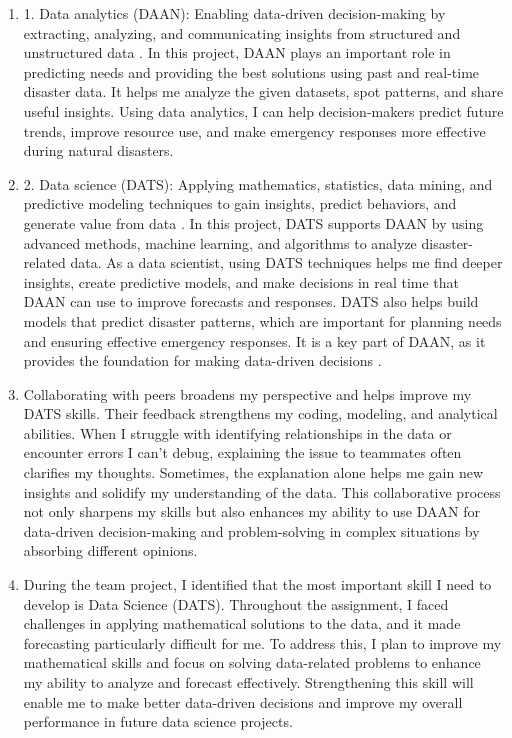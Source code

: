 \documentclass[a4paper, 11pt]{report}
\begin{document}
\begin{enumerate}
	\item 1. Data analytics (DAAN): Enabling data-driven decision-making by extracting, analyzing, and communicating insights from structured and unstructured data \cite{palma2023}. In this project, DAAN plays an important role in predicting needs and providing the best solutions using past and real-time disaster data. It helps me analyze the given datasets, spot patterns, and share useful insights. Using data analytics, I can help decision-makers predict future trends, improve resource use, and make emergency responses more effective during natural disasters.


	\item 2. Data science (DATS): Applying mathematics, statistics, data mining, and predictive modeling techniques to gain insights, predict behaviors, and generate value from data \cite{palma2023}. In this project, DATS supports DAAN by using advanced methods, machine learning, and algorithms to analyze disaster-related data. As a data scientist, using DATS techniques helps me find deeper insights, create predictive models, and make decisions in real time that DAAN can use to improve forecasts and responses. DATS also helps build models that predict disaster patterns, which are important for planning needs and ensuring effective emergency responses. It is a key part of DAAN, as it provides the foundation for making data-driven decisions \cite{anderson2008}.


	\item Collaborating with peers broadens my perspective and helps improve my DATS skills. Their feedback strengthens my coding, modeling, and analytical abilities. When I struggle with identifying relationships in the data or encounter errors I can't debug, explaining the issue to teammates often clarifies my thoughts. Sometimes, the explanation alone helps me gain new insights and solidify my understanding of the data. This collaborative process not only sharpens my skills but also enhances my ability to use DAAN for data-driven decision-making and problem-solving in complex situations by absorbing different opinions.

	\item During the team project, I identified that the most important skill I need to develop is Data Science (DATS). Throughout the assignment, I faced challenges in applying mathematical solutions to the data, and it made forecasting particularly difficult for me. To address this, I plan to improve my mathematical skills and focus on solving data-related problems to enhance my ability to analyze and forecast effectively. Strengthening this skill will enable me to make better data-driven decisions and improve my overall performance in future data science projects.


\end{enumerate}
\end{document}

